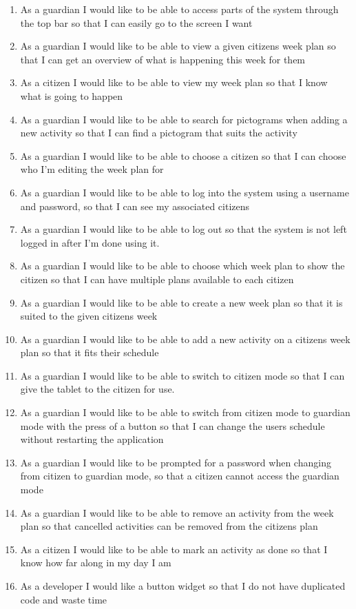 \begin{enumerate}
    \item As a guardian I would like to be able to access parts of the system through the top bar so that I can easily go to the screen I want
    \item As a guardian I would like to be able to view a given citizens week plan so that I can get an overview of what is happening this week for them
    \item As a citizen I would like to be able to view my week plan so that I know what is going to happen
    \item As a guardian I would like to be able to search for pictograms when adding a new activity so that I can find a pictogram that suits the activity
    \item As a guardian I would like to be able to choose a citizen so that I can choose who I’m editing the week plan for
    \item As a guardian I would like to be able to log into the system using a username and password, so that I can see my associated citizens
    \item As a guardian I would like to be able to log out so that the system is not left logged in after I’m done using it. 
    \item As a guardian I would like to be able to choose which week plan to show the citizen so that I can have multiple plans available to each citizen
    \item As a guardian I would like to be able to create a new week plan so that it is suited to the given citizens week 
    \item As a guardian I would like to be able to add a new activity on a citizens week plan so that it fits their schedule
    \item As a guardian I would like to be able to switch to citizen mode so that I can give the tablet to the citizen for use.
    \item As a guardian I would like to be able to switch from citizen mode to guardian mode with the press of a button so that I can change the users schedule without restarting the application
    \item As a guardian I would like to be prompted for a password when changing from citizen to guardian mode, so that a citizen cannot access the guardian mode
    \item As a guardian I would like to be able to remove an activity from the week plan so that cancelled activities can be removed from the citizens plan
    \item As a citizen I would like to be able to mark an activity as done so that I know how far along in my day I am
    \item As a developer I would like a button widget so that I do not have duplicated code and waste time
\end{enumerate}

